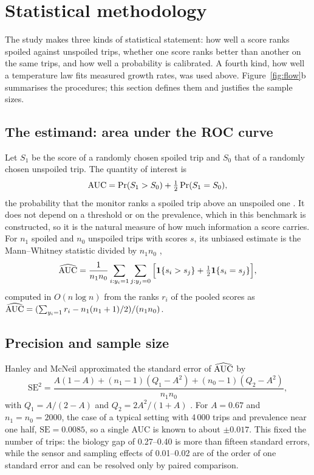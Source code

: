\section{Statistical methodology}\label{sec:stats}
The study makes three kinds of statistical statement: how well a score ranks spoiled against unspoiled trips, whether one score ranks better than another on the same trips, and how well a probability is calibrated. A fourth kind, how well a temperature law fits measured growth rates, was used above. Figure~\ref{fig:flow}b summarises the procedures; this section defines them and justifies the sample sizes.


\subsection{The estimand: area under the ROC curve}
Let $S_1$ be the score of a randomly chosen spoiled trip and $S_0$ that of a randomly chosen unspoiled trip. The quantity of interest is
\begin{equation}\label{eq:aucdef}
\mathrm{AUC}=\Pr(S_1>S_0)+\tfrac12\Pr(S_1=S_0),
\end{equation}
the probability that the monitor ranks a spoiled trip above an unspoiled one \cite{hanley1982}. It does not depend on a threshold or on the prevalence, which in this benchmark is constructed, so it is the natural measure of how much information a score carries. For $n_1$ spoiled and $n_0$ unspoiled trips with scores $s$, its unbiased estimate is the Mann--Whitney statistic divided by $n_1n_0$ \cite{mannwhitney1947},
\begin{equation}\label{eq:auc}
\widehat{\mathrm{AUC}}=\frac{1}{n_1n_0}\sum_{i:y_i=1}\sum_{j:y_j=0}\Big[\mathbf 1\{s_i>s_j\}+\tfrac12\mathbf 1\{s_i=s_j\}\Big],
\end{equation}
computed in $O(n\log n)$ from the ranks $r_i$ of the pooled scores as $\widehat{\mathrm{AUC}}=(\sum_{y_i=1}r_i-n_1(n_1+1)/2)/(n_1n_0)$.

\subsection{Precision and sample size}
Hanley and McNeil approximated the standard error of $\widehat{\mathrm{AUC}}$ by
\begin{equation}\label{eq:hm}
\mathrm{SE}^2=\frac{A(1-A)+(n_1-1)(Q_1-A^2)+(n_0-1)(Q_2-A^2)}{n_1n_0},
\end{equation}
with $Q_1=A/(2-A)$ and $Q_2=2A^2/(1+A)$ \cite{hanley1982}. For $A=0.67$ and $n_1=n_0=2000$, the case of a typical setting with 4\,000 trips and prevalence near one half, $\mathrm{SE}=0.0085$, so a single AUC is known to about $\pm0.017$. This fixed the number of trips: the biology gap of 0.27--0.40 is more than fifteen standard errors, while the sensor and sampling effects of 0.01--0.02 are of the order of one standard error and can be resolved only by paired comparison.


